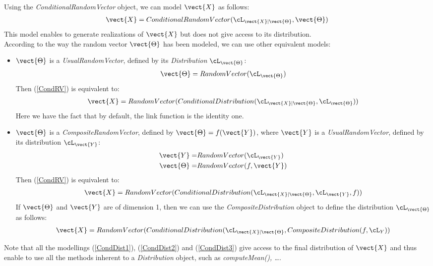 Using the {\itshape ConditionalRandomVector} object, we can model $\vect{X}$ as follows:
\begin{align*}\label{CondRV}
  \vect{X} = ConditionalRandomVector(\cL_{\vect{X}|\vect{\Theta}}, \vect{\Theta})
\end{align*}
This model enables to generate realizations of $\vect{X}$ but does not give access to its distribution.\\
According to the way the random vector $\vect{\Theta}$ has been modeled, we can use other equivalent models:
\begin{itemize}
\item $\vect{\Theta}$ is a {\itshape UsualRandomVector}, defined by its {\itshape Distribution} $\cL_{\vect{\Theta}}$:
  \begin{align*}
    \vect{\Theta} = RandomVector(\cL_{\vect{\Theta}})
  \end{align*}
  Then (\ref{CondRV}) is equivalent to:
  \begin{align}\label{CondDist1}
    \vect{X} = RandomVector(ConditionalDistribution(\cL_{\vect{X}|\vect{\Theta}}, \cL_{\vect{\Theta}}))
  \end{align}
  Here we have the fact that by default, the link function is the identity one.

\item $\vect{\Theta}$ is a {\itshape CompositeRandomVector}, defined by $\vect{\Theta} = f(\vect{Y})$, where $\vect{Y}$ is a {\itshape UsualRandomVector},
  defined by its distribution $\cL_{\vect{Y}}$:
  \begin{align*}
    \vect{Y} = & RandomVector(\cL_{\vect{Y}})\\
    \vect{\Theta} = & RandomVector(f, \vect{Y})
  \end{align*}
  Then (\ref{CondRV}) is equivalent to:
  \begin{align}\label{CondDist2}
    \vect{X} = RandomVector(ConditionalDistribution(\cL_{\vect{X}|\vect{\Theta}}, \cL_{\vect{Y}}, f))
  \end{align}
  If $\vect{\Theta}$ and $\vect{Y}$ are of dimension 1, then we can use the {\itshape CompositeDistribution} object to define the distribution $\cL_{\vect{\Theta}}$ as follows:
  \begin{align}\label{CondDist3}
    \vect{X} = RandomVector(ConditionalDistribution(\cL_{\vect{X}|\vect{\Theta}}, CompositeDistribution(f,\cL_{Y}))
  \end{align}

\end{itemize}
Note that all the modellings (\ref{CondDist1}), (\ref{CondDist2}) and (\ref{CondDist3}) give access to the final distribution of $\vect{X}$ and thus enable to use all the methods inherent to a {\itshape Distribution} object, such as {\itshape computeMean(), \dots}.